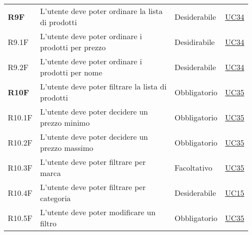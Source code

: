 \begin{center}
\begin{longtable}[!h]{p{50px} p{245px} p{75px} p{50px}}
        \textbf{R9F}                          & L'utente deve poter ordinare la lista di prodotti                                                                                                      & Desiderabile             & \hyperref[sec:UC34]{UC34}                      \\
        R9.1F                                 & L'utente deve poter ordinare i prodotti per prezzo                                                                                                     & Desidirabile             & \hyperref[sec:UC34]{UC34}                      \\
        R9.2F                                 & L'utente deve poter ordinare i prodotti per nome                                                                                                       & Desiderabile             & \hyperref[sec:UC34]{UC34}                      \\
        \textbf{R10F}                         & L'utente deve poter filtrare la lista di prodotti                                                                                                      & Obbligatorio             & \hyperref[sec:UC35]{UC35}                      \\
        R10.1F                                & L'utente deve poter decidere un prezzo minimo                                                                                                          & Obbligatorio             & \hyperref[sec:UC35]{UC35}                      \\
        R10.2F                                & L'utente deve poter decidere un prezzo massimo                                                                                                         & Obbligatorio             & \hyperref[sec:UC35]{UC35}                      \\
        R10.3F                                & L'utente deve poter filtrare per marca                                                                                                                 & Facoltativo              & \hyperref[sec:UC35]{UC35}                      \\
        R10.4F                                & L'utente deve poter filtrare per categoria                                                                                                             & Desiderabile             & \hyperref[sec:UC15]{UC15}                      \\
        R10.5F                                & L'utente deve poter modificare un filtro                                                                                                               & Obbligatorio             & \hyperref[sec:UC35]{UC35}                      \\

\end{longtable}
\end{center}
